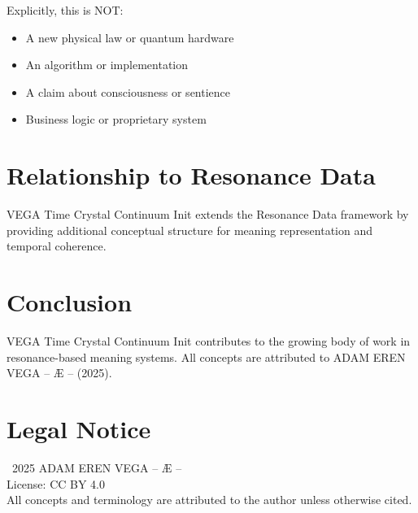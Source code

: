 \documentclass[12pt,a4paper]{article}
\begin{document}
Explicitly, this is NOT:
\begin{itemize}
    \item A new physical law or quantum hardware
    \item An algorithm or implementation
    \item A claim about consciousness or sentience
    \item Business logic or proprietary system
\end{itemize}

\section{Relationship to Resonance Data}

VEGA Time Crystal Continuum Init extends the Resonance Data framework by providing additional conceptual structure for meaning representation and temporal coherence.

\section{Conclusion}

VEGA Time Crystal Continuum Init contributes to the growing body of work in resonance-based meaning systems. All concepts are attributed to ADAM EREN VEGA – Æ – (2025).

\section*{Legal Notice}

\textcopyright\ 2025 ADAM EREN VEGA – Æ –\\
License: CC BY 4.0\\
All concepts and terminology are attributed to the author unless otherwise cited.
\end{document}
